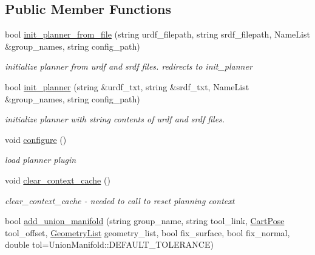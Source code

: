 \subsection*{Public Member Functions}
\begin{DoxyCompactItemize}
\item 
bool \hyperlink{class_r_n_b_1_1_moveit_compact_1_1_planner_ae7acfa0a899d0c692e6f01701e1c360d}{init\+\_\+planner\+\_\+from\+\_\+file} (string urdf\+\_\+filepath, string srdf\+\_\+filepath, Name\+List \&group\+\_\+names, string config\+\_\+path)
\begin{DoxyCompactList}\small\item\em initialize planner from urdf and srdf files. redirects to init\+\_\+planner \end{DoxyCompactList}\item 
bool \hyperlink{class_r_n_b_1_1_moveit_compact_1_1_planner_a43e6dccb94ecdf155ab93ee05c47dbe4}{init\+\_\+planner} (string \&urdf\+\_\+txt, string \&srdf\+\_\+txt, Name\+List \&group\+\_\+names, string config\+\_\+path)
\begin{DoxyCompactList}\small\item\em initialize planner with string contents of urdf and srdf files. \end{DoxyCompactList}\item 
void \hyperlink{class_r_n_b_1_1_moveit_compact_1_1_planner_aa89d4eb9a041cd3560a23d01b763e8a5}{configure} ()
\begin{DoxyCompactList}\small\item\em load planner plugin \end{DoxyCompactList}\item 
void \hyperlink{class_r_n_b_1_1_moveit_compact_1_1_planner_a34aebe9c8aff383648865d359ca113dc}{clear\+\_\+context\+\_\+cache} ()
\begin{DoxyCompactList}\small\item\em clear\+\_\+context\+\_\+cache -\/ needed to call to reset planning context \end{DoxyCompactList}\item 
bool \hyperlink{class_r_n_b_1_1_moveit_compact_1_1_planner_a5d812b9a01c40fc99dfd2f7cd9a3c917}{add\+\_\+union\+\_\+manifold} (string group\+\_\+name, string tool\+\_\+link, \hyperlink{class_r_n_b_1_1_moveit_compact_1_1_cart_pose}{Cart\+Pose} tool\+\_\+offset, \hyperlink{class_r_n_b_1_1_moveit_compact_1_1_geometry_list}{Geometry\+List} geometry\+\_\+list, bool fix\+\_\+surface, bool fix\+\_\+normal, double tol=Union\+Manifold\+::\+D\+E\+F\+A\+U\+L\+T\+\_\+\+T\+O\+L\+E\+R\+A\+N\+CE)

\end{DoxyCompactItemize}
